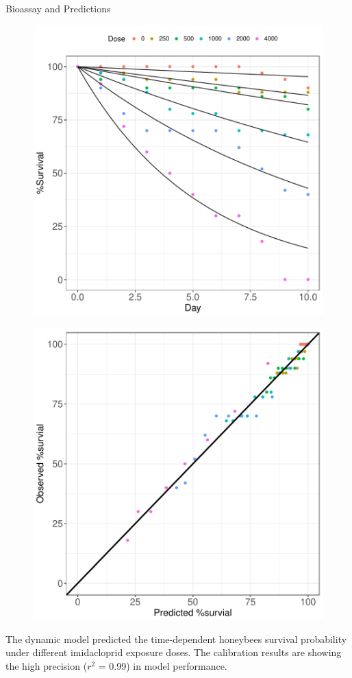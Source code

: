 \documentclass[final,t]{beamer}
\begin{document}
\begin{frame}[fragile]
\begin{columns}[t]
\begin{column}{0.16\linewidth}
\begin{block}{Bioassay and Predictions}
        \begin{figure}[htb]
        \includegraphics[width=.8\columnwidth]{beamerpostertest-fig1}
        \end{figure}
        \begin{figure}[htb]
        \includegraphics[width=.8\columnwidth]{beamerpostertest-fig2}
        \end{figure}
        The dynamic model predicted the time-dependent honeybees survival probability under different imidacloprid exposure doses. The calibration results are showing the high precision ($r^2$ = 0.99) in model performance.
        

\end{block}
\end{column}
\end{columns}
\end{frame}
\end{document}
